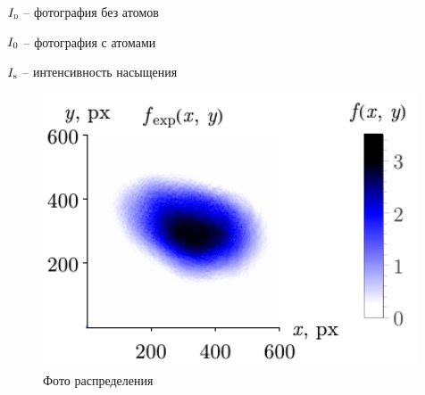 \begin{minipage}{0.31\textwidth}

$\subt{I}{D}$ -- фотография без атомов

$I_{\textnormal{0}}$ -- фотография с атомами

$I_{\textnormal{s}}$ -- интенсивность насыщения

\begin{figure}[h]
    \centering
    \includegraphics[width=0.99\textwidth]{../MOT/figs/fit_mot_v4.pdf}
    \caption{Фото распределения}
\end{figure}


\end{minipage}
